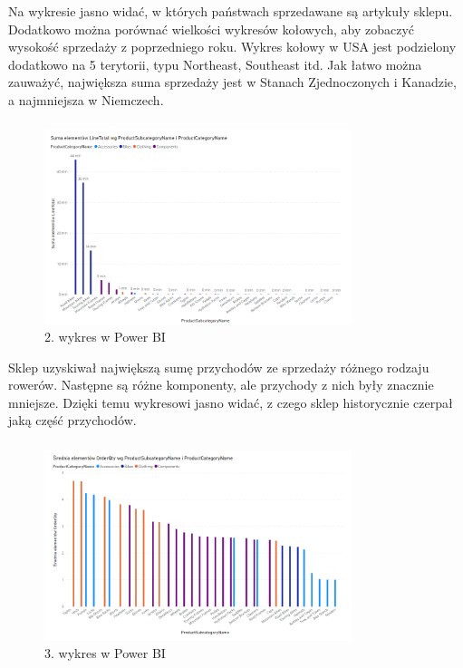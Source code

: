 \documentclass[a4paper,12pt]{article}
\begin{document}
Na wykresie jasno widać, w których państwach sprzedawane są artykuły sklepu. Dodatkowo można porównać wielkości wykresów kołowych, aby zobaczyć wysokość sprzedaży z poprzedniego roku. Wykres kołowy w USA jest podzielony dodatkowo na 5 terytorii, typu Northeast, Southeast itd. Jak łatwo można zauważyć, największa suma sprzedaży jest w Stanach Zjednoczonych i Kanadzie, a najmniejsza w Niemczech.

\subsubsection{}

\begin{figure}[H]
    \centering
    \includegraphics[width=0.8\textwidth]{images/power_bi/02.png}
    \caption{2. wykres w Power BI}
\end{figure}

Sklep uzyskiwał największą sumę przychodów ze sprzedaży różnego rodzaju rowerów. Następne są różne komponenty, ale przychody z nich były znacznie mniejsze. Dzięki temu wykresowi jasno widać, z czego sklep historycznie czerpał jaką część przychodów.

\subsubsection{}

\begin{figure}[H]
    \centering
    \includegraphics[width=0.8\textwidth]{images/power_bi/03.png}
    \caption{3. wykres w Power BI}
\end{figure}
\end{document}
